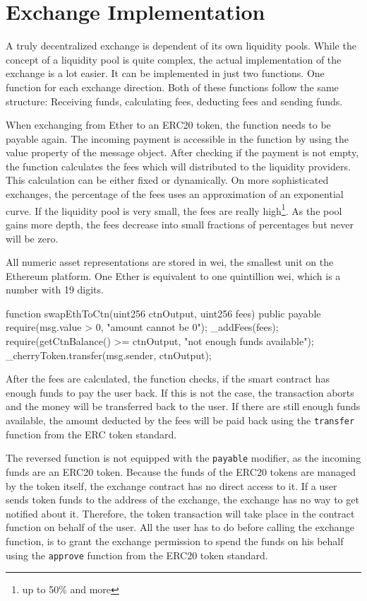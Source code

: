 \section{Exchange Implementation}
A truly decentralized exchange is dependent of its own liquidity pools. While the concept of a liquidity pool is quite complex, the actual implementation
of the exchange is a lot easier. It can be implemented in just two functions. One function for each exchange direction. Both of these functions follow
the same structure: Receiving funds, calculating fees, deducting fees and sending funds.

When exchanging from Ether to an ERC20 token, the function needs to be payable again. The incoming payment is accessible in the function by using the value
property of the message object. After checking if the payment is not empty, the function calculates the fees which will distributed to the liquidity providers.
This calculation can be either fixed or dynamically. On more sophisticated exchanges, the percentage of the fees uses an approximation of an exponential curve.
If the liquidity pool is very small, the fees are really high\footnote{up to 50\% and more}. As the pool gains more depth, the fees decrease into small fractions
of percentages but never will be zero.

All numeric asset representations are stored in wei, the smallest unit on the Ethereum platform. One Ether is equivalent to one quintillion wei, which is a
number with 19 digits.

\begin{GenericCode}
function swapEthToCtn(uint256 ctnOutput, uint256 fees) public payable {
  require(msg.value > 0, "amount cannot be 0");
  _addFees(fees);
  require(getCtnBalance() >= ctnOutput, "not enough funds available");
  _cherryToken.transfer(msg.sender, ctnOutput);
}
\end{GenericCode}

After the fees are calculated, the function checks, if the smart contract has enough funds to pay the user back. If this is not the case, the transaction aborts
and the money will be transferred back to the user. If there are still enough funds available, the amount deducted by the fees will be paid back using the
\texttt{transfer} function from the ERC token standard.

The reversed function is not equipped with the \texttt{payable} modifier, as the incoming funds are an ERC20 token. Because the funds of the ERC20 tokens are
managed by the token itself, the exchange contract has no direct access to it. If a user sends token funds to the address of the exchange, the exchange has no
way to get notified about it. Therefore, the token transaction will take place in the contract function on behalf of the user. All the user has to do before
calling the exchange function, is to grant the exchange permission to spend the funds on his behalf using the \texttt{approve} function from the ERC20 token
standard.

